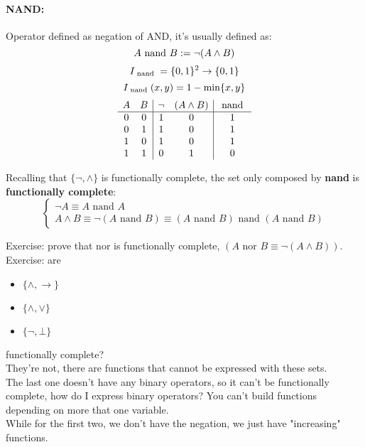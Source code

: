 \documentclass[11pt]{article}
\begin{document}
	\paragraph{NAND:} Operator defined as negation of AND, it's usually defined as: 
	$$ A \text{ nand } B := \neg (A \wedge B) $$
	$$ I_{\text{ nand }} = \{0,1\}^2 \rightarrow \{0,1\} $$
	$$ I_{\text{ nand }} (x,y) = 1 - \min\{x,y\}$$
	$$
	\begin{array}{c c | c c | c}
		A & B & \neg & (A \wedge B) & \text{ nand } \\
		\hline
		0 & 0 & 1 & 0 & 1 \\
		0 & 1 & 1 & 0 & 1 \\
		1 & 0 & 1 & 0 & 1 \\
		1 & 1 & 0 & 1 & 0 \\
	\end{array}
	$$
	
	
	Recalling that $\{\neg, \wedge\}$ is functionally complete, the set only composed by \textbf{nand} is \textbf{functionally complete}:
	$$
	\begin{cases}
		\neg A \equiv A \text{ nand } A \\
		A \wedge B \equiv \neg (A \text{ nand } B) \equiv (A \text{ nand } B) \text{ nand } (A \text{ nand } B)
	\end{cases}
	$$
	
	\newpage
	
	Exercise: prove that nor is functionally complete, $(A \text{ nor } B \equiv \neg (A \wedge B))$.\\
	
	Exercise: are
	\begin{itemize}
		\item $\{\wedge, \rightarrow\}$
		\item $\{\wedge, \vee\}$
		\item $\{\neg, \bot\}$
	\end{itemize}
	
	functionally complete? \\
	
	They're not, there are functions that cannot be expressed with these sets.\\
	
	The last one doesn't have any binary operators, so it can't be functionally complete, how do I express binary operators? You can't build functions depending on more that one variable.\\
	
	While for the first two, we don't have the negation, we just have "increasing" functions.\\
	
\end{document}
